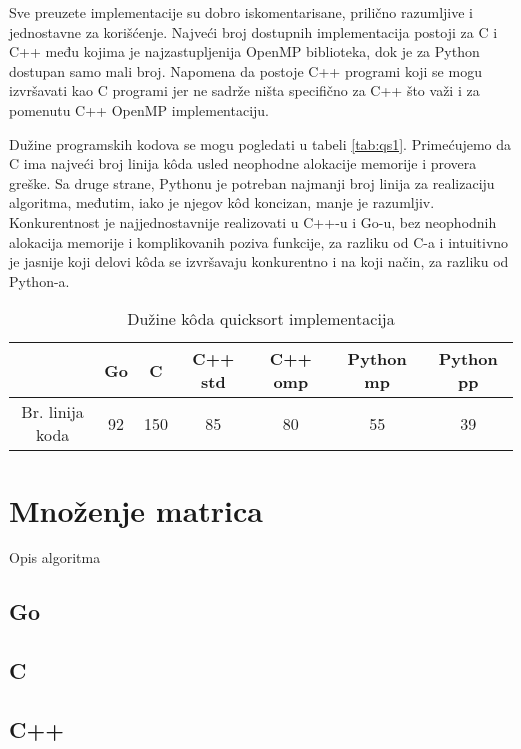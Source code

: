 \documentclass[12pt,oneside]{memoir}
\begin{document}
Sve preuzete implementacije su dobro iskomentarisane, prilično razumljive i jednostavne za korišćenje. Najveći broj dostupnih implementacija postoji za C i C++ među kojima je najzastupljenija OpenMP biblioteka, dok je za Python dostupan samo mali broj. Napomena da postoje C++ programi koji se mogu izvršavati kao C programi jer ne sadrže ništa specifično za C++ što važi i za pomenutu C++ OpenMP implementaciju.

Dužine programskih kodova se mogu pogledati u tabeli \ref{tab:qs1}. Primećujemo da C ima najveći broj linija k\^{o}da usled neophodne alokacije memorije i provera greške. Sa druge strane, Pythonu je potreban najmanji broj linija za realizaciju algoritma, međutim, iako je njegov k\^{o}d koncizan, manje je razumljiv. Konkurentnost je najjednostavnije realizovati u C++-u i Go-u, bez neophodnih alokacija memorije i komplikovanih poziva funkcije, za razliku od C-a i intuitivno je jasnije koji delovi k\^{o}da se izvršavaju konkurentno i na koji način, za razliku od Python-a.

\begin{table}
\begin{center}
\caption{Dužine k\^{o}da quicksort implementacija}
\begin{tabular}{|c|c|c|c|c|c|c|}
\hline
		& Go	&  C 	& C++ std	& C++ omp	& Python mp & Python pp \\ \hline
Br. linija koda& 92	& 150	&85		&80		&55		&39	 \\ \hline
\end{tabular}
\label{tab:qs2}
\end{center}
\end{table}

\section{Množenje matrica}
Opis algoritma

\subsection{Go}

\subsection{C}

\subsection{C++}
\end{document}
